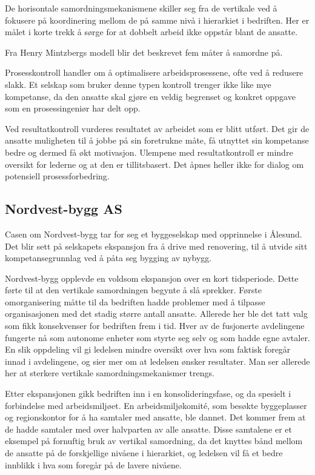 \documentclass[norsk]{article}
\begin{document}
De horisontale samordningsmekanismene skiller seg fra de vertikale ved å fokusere på koordinering mellom de på samme nivå i hierarkiet i bedriften. Her er målet i korte trekk å sørge for at dobbelt arbeid ikke oppstår blant de ansatte.

Fra Henry Mintzbergs modell blir det beskrevet fem måter å samordne på. 

Prosesskontroll handler om å optimalisere arbeidsprosessene, ofte ved å redusere slakk. Et selskap som bruker denne typen kontroll trenger ikke like mye kompetanse, da den ansatte skal gjøre en veldig begrenset og konkret oppgave som en prosessingeniør har delt opp. 

Ved resultatkontroll vurderes resultatet av arbeidet som er blitt utført. Det gir de ansatte muligheten til å jobbe på sin foretrukne måte, få utnyttet sin kompetanse bedre og dermed få økt motivasjon. Ulempene med resultatkontroll er mindre oversikt for lederne og at den er tillitsbasert. Det åpnes heller ikke for dialog om potensiell prosessforbedring. 

\subsection{Nordvest-bygg AS}

Casen om Nordvest-bygg tar for seg et byggeselskap med opprinnelse i Ålesund. Det blir sett på selskapets ekspansjon fra å drive med renovering, til å utvide sitt kompetansegrunnlag ved å påta seg bygging av nybygg.

Nordvest-bygg opplevde en voldsom ekspansjon over en kort tidsperiode. Dette førte til at den vertikale samordningen begynte å slå sprekker. Første omorganisering måtte til da bedriften hadde problemer med å tilpasse organisasjonen med det stadig større antall ansatte. Allerede her ble det tatt valg som fikk konsekvenser for bedriften frem i tid. Hver av de fusjonerte avdelingene fungerte nå som autonome enheter som styrte seg selv og som hadde egne avtaler. 
En slik oppdeling vil gi ledelsen mindre oversikt over hva som faktisk foregår innad i avdelingene, og sier mer om at ledelsen ønsker resultater. Man ser allerede her at sterkere vertikale samordningsmekanismer trengs.

Etter ekspansjonen gikk bedriften inn i en konsolideringsfase, og da spesielt i forbindelse med arbeidsmiljøet. En arbeidsmiljøkomité, som besøkte byggeplasser og regionskontor for å ha samtaler med ansatte, ble dannet. Det kommer frem at de hadde samtaler med over halvparten av alle ansatte. Disse samtalene er et eksempel på fornuftig bruk av vertikal samordning, da det knyttes bånd mellom de ansatte på de forskjellige nivåene i hierarkiet, og ledelsen vil få et bedre innblikk i hva som foregår på de lavere nivåene.
\end{document}
